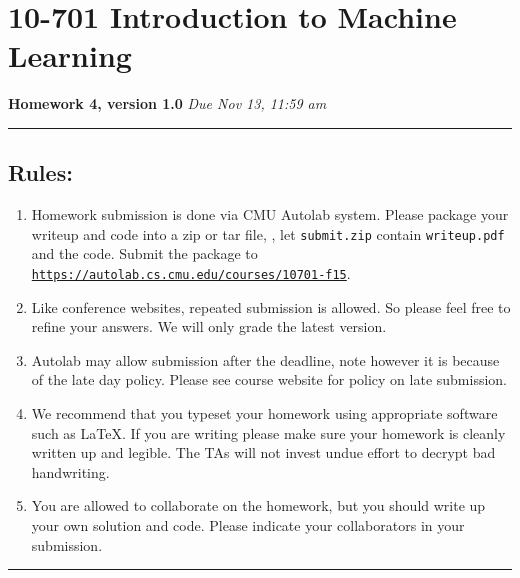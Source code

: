 \section*{10-701 Introduction to Machine Learning}
{\large \bf Homework 4, version 1.0} 
\hfill {\it Due Nov 13, 11:59 am}

\noindent\rule{\textwidth}{1pt}

\vspace{5ex}
\subsection*{Rules:}
\vspace{2ex}

\begin{enumerate}
\item Homework submission is done via CMU Autolab system. 
Please package your writeup and code into a zip or tar file, \eg, let {\tt submit.zip} contain {\tt writeup.pdf} and the code.
Submit the package to  {\tt \href{https://autolab.cs.cmu.edu/courses/10701-f15}{https://autolab.cs.cmu.edu/courses/10701-f15}}. 


\item Like conference websites, repeated submission is allowed. 
So please feel free to refine your answers. 
We will only grade the latest version.

\item Autolab may allow submission after the deadline, note however it is because of the late day policy. Please see course website for policy on late submission. 

\item We recommend that you typeset your homework using appropriate software such as \LaTeX. If you are writing please make sure your homework is cleanly written up and legible. The TAs will not invest undue effort to decrypt bad handwriting.

\item You are allowed to collaborate on the homework, but you should write up your own solution and code. Please indicate your collaborators in your submission.

\end{enumerate}

\vspace{7ex}

\noindent\rule{\textwidth}{1pt}
